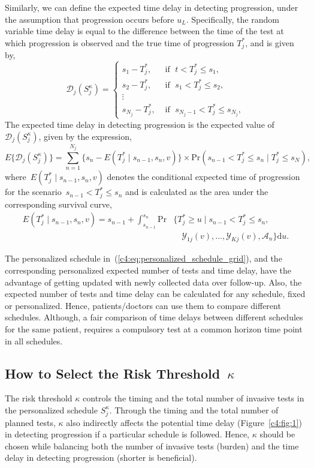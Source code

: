 Similarly, we can define the expected time delay in detecting progression, under the assumption that progression occurs before $u_L$. Specifically, the random variable time delay is equal to the difference between the time of the test at which progression is observed and the true time of progression $T_j^*$, and is given by,
\[
\mathcal D_j (S^\kappa_j) = \left \{
\begin{array}{ll}
s_1 - T_j^*, & \mbox{ if } \; t < T^*_j \leq s_1,\\
s_2 - T_j^*, & \mbox{ if } \; s_1 < T^*_j \leq s_2,\\
\vdots&\\
s_{N_j} - T_j^*, & \mbox{ if } \; s_{N_j-1} < T^*_j \leq s_{N_j},
\end{array}
\right.
\]
The expected time delay in detecting progression is the expected value of $\mathcal D_j (S^\kappa_j)$, given by the expression,
\begin{equation*}
\label{c4:eq:exp_delay}
E \big \{ \mathcal D_j(S^\kappa_j)\big\} = \sum_{n = 1}^{N_j} \Big\{s_n - E(T^*_j \mid s_{n-1}, s_n, v)\Big\} \times \mbox{Pr}(s_{n-1} < T^*_j \leq s_n\mid T^*_j \leq s_N),
\end{equation*}
where~$E(T^*_j \mid s_{n-1}, s_n, v)$ denotes the conditional expected time of progression for the scenario~$s_{n-1} < T^*_j \leq s_n$ and is calculated as the area under the corresponding survival curve,
\begin{equation*}
\begin{split}
E(T^*_j \mid s_{n-1}, s_n, v) = s_{n-1} + \int_{s_{n-1}}^{s_n} \mbox{Pr} & \Big\{T^*_j \geq u \mid s_{n-1} < T^*_j \leq s_n,\\ & \quad \mathcal{Y}_{1j}(v), \ldots, \mathcal{Y}_{Kj}(v), \mathcal{A}_n\Big\} \mathrm{d}u.
\end{split}
\end{equation*}

The personalized schedule in~(\ref{c4:eq:personalized_schedule_grid}), and the corresponding personalized expected number of tests and time delay, have the advantage of getting updated with newly collected data over follow-up. Also, the expected number of tests and time delay can be calculated for any schedule, fixed or personalized. Hence, patients/doctors can use them to compare different schedules. Although, a fair comparison of time delays between different schedules for the same patient, requires a compulsory test at a common horizon time point in all schedules.

\subsection{How to Select the Risk Threshold~$\kappa$}
\label{c4:subsec:kappa_selection}
The risk threshold $\kappa$ controls the timing and the total number of invasive tests in the personalized schedule $S^\kappa_j$. Through the timing and the total number of planned tests, $\kappa$ also indirectly affects the potential time delay (Figure~\ref{c4:fig:1}) in detecting progression if a particular schedule is followed. Hence, $\kappa$ should be chosen while balancing both the number of invasive tests (burden) and the time delay in detecting progression (shorter is beneficial).

